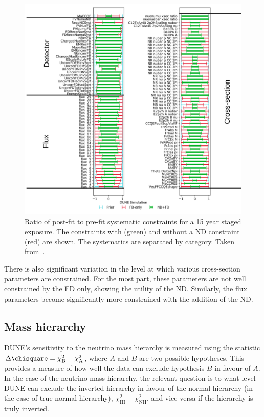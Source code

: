 \begin{figure}[h]
	\centering
	\includegraphics[width=.8\linewidth]{files/figures/dune_lbl/constraintsWithLines}
	\caption[DUNE systematic constraints with and without a near detector constraint]{Ratio of post-fit to pre-fit systematic constraints for a 15 year staged exposure. The constraints with (green) and without a ND constraint (red) are shown. The systematics are separated by category. Taken from~\cite{Abi:2020qib}.}
	\label{fig:systConstraints}
\end{figure}

There is also significant variation in the level at which various cross-section parameters are constrained. 
For the most part, these parameters are not well constrained by the FD only, showing the utility of the ND.
Similarly, the flux parameters become significantly more constrained with the addition of the ND.

\subsection{Mass hierarchy}
\label{sec:dune_lbl:sensitivities:mh}

DUNE's sensitivity to the neutrino mass hierarchy is measured using the statistic $\Delta \chisquare = \chi^{2}_{\text{B}} - \chi^{2}_{\text{A}}$, where $A$ and $B$ are two possible hypotheses.
This provides a measure of how well the data can exclude hypothesis $B$ in favour of $A$.
In the case of the neutrino mass hierarchy, the relevant question is to what level DUNE can exclude the inverted hierarchy in favour of the normal hierarchy (in the case of true normal hierarchy), $\chi^{2}_{\text{IH}} - \chi^{2}_{\text{NH}}$, and vice versa if the hierarchy is truly inverted.

